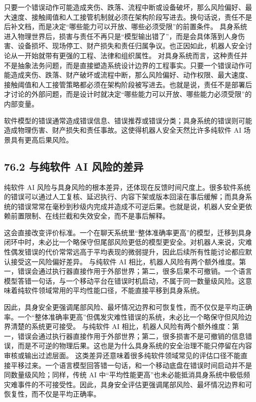 只要一个错误动作可能造成夹伤、跌落、流程中断或设备破坏，那么风险偏好、最大速度、接触阈值和人工接管机制就必须在架构阶段写进去。换句话说，责任不是后补文档，而是决定“哪些能力可以开放、哪些必须受限”的前置条件。 具身系统进入物理世界后，损害与责任不再只是“模型输出错了”，而是会具体落到人身伤害、设备损坏、现场停工、财产损失和责任归属争议。也正因如此，机器人安全讨论从一开始就带有更强的工程、法律和组织属性。 对具身系统而言，这种责任并不是抽象法务问题，而是直接塑造系统设计边界的工程事实。只要一个错误动作可能造成夹伤、跌落、财产破坏或流程中断，那么风险偏好、动作权限、最大速度、接触阈值和人工接管策略都必须在架构阶段被写进去。也就是说，责任不是部署后才讨论的外部问题，而是设计时就决定“哪些能力可以开放、哪些能力必须受限”的内部变量。

软件模型的错误通常造成错误信息、错误推荐或错误分类；具身系统的错误则可能造成物理伤害、财产损失和责任事故。这使得机器人安全天然比许多纯软件 AI 场景具有更高后果风险。

\subsection*{76.2 与纯软件 AI 风险的差异}


纯软件 AI 风险与具身风险的根本差异，还体现在反馈时间尺度上。很多软件系统的错误可以通过人工复核、延迟执行、内容下架或版本回滚在事后缓解；而具身系统的错误常常在毫秒到秒级内完成并造成不可逆后果。也就是说，机器人安全更依赖前置限制、在线拦截和失效安全，而不是事后解释。

这会直接改变评价标准。一个在聊天系统里“整体准确率更高”的模型，迁移到具身闭环中时，未必比一个略保守但尾部风险更低的模型更安全。对机器人来说，灾难性偶发错误的代价常常远高于平均表现的微弱提升，因此后续所有性能讨论都应默认接受这一风险偏好差异。 与纯软件 AI 相比，机器人风险有两个额外维度。第一，错误会通过执行器直接作用于外部世界；第二，很多后果不可撤销。一个语言模型答错一句话，与一个移动平台在错误时机启动，不属于同一数量级风险。这意味着纯软件领域常用的平均性能口径，不能直接平移到具身系统。

因此，具身安全更强调尾部风险、最坏情况边界和可恢复性，而不仅仅是平均正确率。一个“整体准确率更高”但偶发灾难性错误的系统，未必比一个略保守但风险边界清楚的系统更可接受。 与纯软件 AI 相比，机器人风险有两个额外维度：第一，错误会通过执行器直接作用于外部世界；第二，很多损害不是可撤销的信息错误，而是不可逆的物理后果。这也是为什么具身系统的安全治理不能只停留在内容审核或输出过滤层面。 这类差异还意味着很多纯软件领域常见的评估口径不能直接平移过来。一个语言模型回答错一句话，和一个移动底盘在错误时间启动并不是同数量级风险；同样，传统 AI 中“平均性能更高”也未必能抵消具身系统中极低频灾难事件的不可接受性。因此，具身安全评估更强调尾部风险、最坏情况边界和可恢复性，而不仅是平均正确率。

